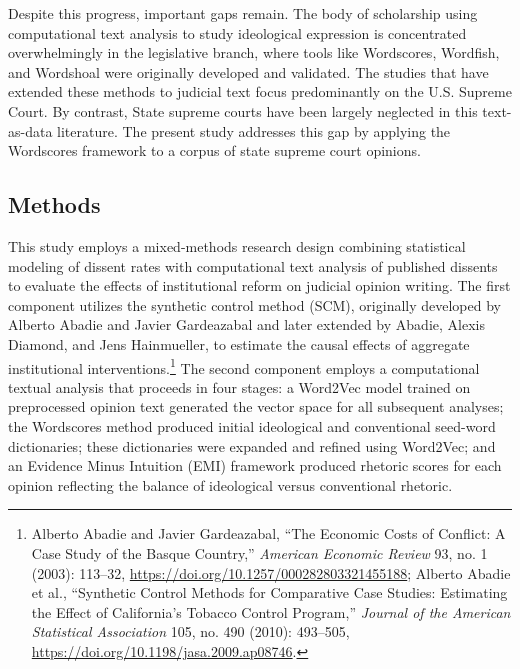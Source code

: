 Despite this progress, important gaps remain. The body of scholarship
using computational text analysis to study ideological expression is
concentrated overwhelmingly in the legislative branch, where tools like
Wordscores, Wordfish, and Wordshoal were originally developed and
validated. The studies that have extended these methods to judicial text
focus predominantly on the U.S. Supreme Court. By contrast, State
supreme courts have been largely neglected in this text-as-data
literature. The present study addresses this gap by applying the
Wordscores framework to a corpus of state supreme court opinions.

\subsection{Methods}\label{methods}

This study employs a mixed-methods research design combining statistical
modeling of dissent rates with computational text analysis of published
dissents to evaluate the effects of institutional reform on judicial
opinion writing. The first component utilizes the synthetic control
method (SCM), originally developed by Alberto Abadie and Javier
Gardeazabal and later extended by Abadie, Alexis Diamond, and Jens
Hainmueller, to estimate the causal effects of aggregate institutional
interventions.\footnote{Alberto Abadie and Javier Gardeazabal, {``The
  {Economic Costs} of {Conflict}: {A Case Study} of the {Basque
  Country},''} \emph{American Economic Review} 93, no. 1 (2003):
  113--32, \url{https://doi.org/10.1257/000282803321455188}; Alberto
  Abadie et al., {``Synthetic {Control Methods} for {Comparative Case
  Studies}: {Estimating} the {Effect} of {California}'s {Tobacco Control
  Program},''} \emph{Journal of the American Statistical Association}
  105, no. 490 (2010): 493--505,
  \url{https://doi.org/10.1198/jasa.2009.ap08746}.} The second component
employs a computational textual analysis that proceeds in four stages: a
Word2Vec model trained on preprocessed opinion text generated the vector
space for all subsequent analyses; the Wordscores method produced
initial ideological and conventional seed-word dictionaries; these
dictionaries were expanded and refined using Word2Vec; and an Evidence
Minus Intuition (EMI) framework produced rhetoric scores for each
opinion reflecting the balance of ideological versus conventional
rhetoric.

